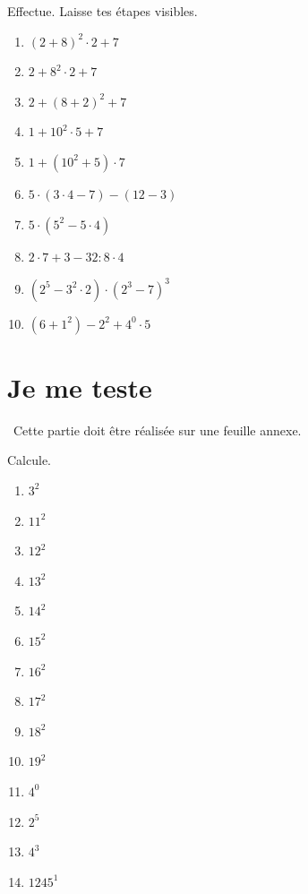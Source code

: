 \documentclass[../../syllabus_1.tex]{subfiles}
\begin{document}
\begin{exercise}
      Effectue. Laisse tes étapes visibles.
      \begin{enumerate}[cols=2]
            \item $\left(2+8\right)^2 \cdot 2+7$
            \item $2+8^2 \cdot 2+7$
            \item $2+ \left(8+2\right)^2 + 7$
            \item $1 + 10^2 \cdot 5 +7$
            \item $1+\left(10^2+5\right)\cdot 7$
            \item $5\cdot \left(3\cdot 4 - 7\right) - \left(12-3\right)$
            \item $5\cdot \left(5^2 - 5 \cdot 4\right)$
            \item $2\cdot 7 + 3 - 32 : 8 \cdot 4$
            \item $\left(2^5 - 3^2\cdot 2\right) \cdot \left(2^3 - 7\right)^3$
            \item $\left(6+1^2\right) - 2^2+4^0 \cdot 5$
      \end{enumerate}
\end{exercise}

\newpage
\section{Je me teste}
~Cette partie doit être réalisée sur une feuille annexe.
\setcounter{exercise}{0}

\begin{exercise}
      Calcule.
 \begin{enumerate}[cols=4]
      \item $3^2$
      \item $11^2$
      \item $12^2$
      \item $13^2$
      \item $14^2$
      \item $15^2$
      \item $16^2$
      \item $17^2$
      \item $18^2$
      \item $19^2$
      \item $4^0$
      \item $2^5$
      \item $4^3$
      \item $1245^1$
 \end{enumerate}
\end{exercise}
\end{document}
